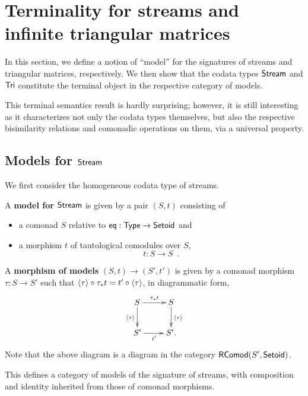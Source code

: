 \documentclass[a4paper,USenglish]{lipics}
\newcommand{\fat}[1]{\textbf{#1}}
\begin{document}
\section{Terminality for streams and infinite triangular matrices}\label{sec:coalgebras_for_tri}

In this section, we define a notion of \enquote{model} for the signatures of streams and triangular matrices,
respectively. We then show that the codata types $\mathsf{Stream}$ and $\mathsf{Tri}$ constitute the terminal object in
the respective category of models.


This terminal semantics result is hardly surprising; however, it is still interesting as it characterizes not only the codata types themselves,
 but also the respective bisimilarity relations and comonadic operations on them, via a universal property.



\subsection{Models for $\mathsf{Stream}$}

We first consider the homogeneous codata type of streams.

\begin{definition}
 \label{cat_stream}
  A \fat{model for $\mathsf{Stream}$} is given by a pair $(S,t)$ 
  consisting of
  \begin{itemize}
   \item a comonad $S$ relative to $\mathsf{eq} : \mathsf{Type} \to \mathsf{Setoid}$ and
   \item a morphism $t$ of tautological comodules over $S$, 
                   \[t : S \to S \enspace . \]
  \end{itemize}
  A \fat{morphism of models} $(S,t) \to (S',t')$ is given by a comonad morphism $\tau : S \to S'$ such that
     $ {\langle {\tau} \rangle} \circ {\tau_*t} = {t'} \circ {\ensuremath{\langle {\tau} \rangle}}$, in diagrammatic form,
 \[
  \begin{xy}
   \xymatrix{
                  S \ar[r]^{\tau_*t} \ar[d]_{\induced{\tau}} & S \ar[d]^{\induced{\tau}}\\
                  S' \ar[r]_{t'} & S' .
   }
  \end{xy}
 \]
  Note that the above diagram is a diagram in the category $\mathsf{RComod}(S', \mathsf{Setoid})$. 
  
  This defines a category of models of the signature of streams, with composition and identity inherited from those of comonad morphisms.

\end{definition}
\end{document}
